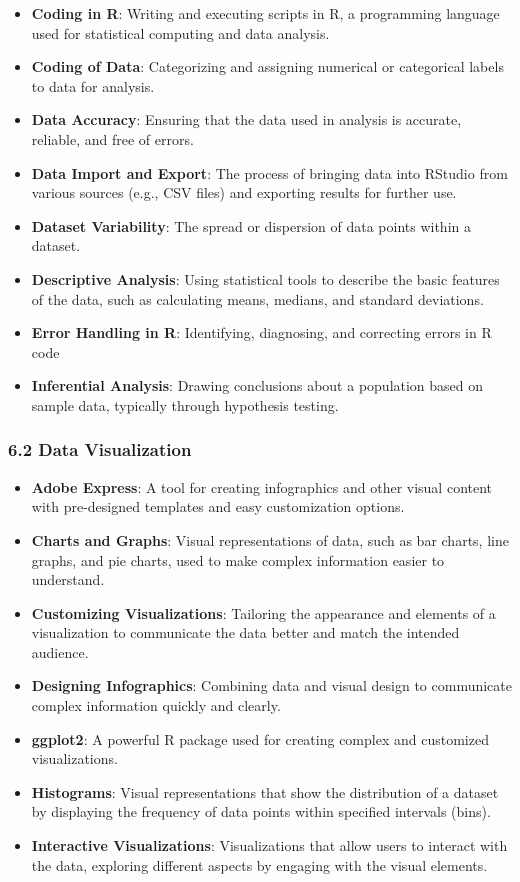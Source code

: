 \documentclass[
]{book}
\providecommand{\tightlist}{%
  \setlength{\itemsep}{0pt}\setlength{\parskip}{0pt}}
\begin{document}
\begin{itemize}
\tightlist
\item
  \textbf{Coding in R}: Writing and executing scripts in R, a programming language used for statistical computing and data analysis.
\item
  \textbf{Coding of Data}: Categorizing and assigning numerical or categorical labels to data for analysis.
\item
  \textbf{Data Accuracy}: Ensuring that the data used in analysis is accurate, reliable, and free of errors.
\item
  \textbf{Data Import and Export}: The process of bringing data into RStudio from various sources (e.g., CSV files) and exporting results for further use.
\item
  \textbf{Dataset Variability}: The spread or dispersion of data points within a dataset.
\item
  \textbf{Descriptive Analysis}: Using statistical tools to describe the basic features of the data, such as calculating means, medians, and standard deviations.
\item
  \textbf{Error Handling in R}: Identifying, diagnosing, and correcting errors in R code
\item
  \textbf{Inferential Analysis}: Drawing conclusions about a population based on sample data, typically through hypothesis testing.
\end{itemize}

\subsubsection*{\texorpdfstring{\textbf{6.2 Data Visualization}}{6.2 Data Visualization}}\label{data-visualization}

\begin{itemize}
\tightlist
\item
  \textbf{Adobe Express}: A tool for creating infographics and other visual content with pre-designed templates and easy customization options.
\item
  \textbf{Charts and Graphs}: Visual representations of data, such as bar charts, line graphs, and pie charts, used to make complex information easier to understand.
\item
  \textbf{Customizing Visualizations}: Tailoring the appearance and elements of a visualization to communicate the data better and match the intended audience.
\item
  \textbf{Designing Infographics}: Combining data and visual design to communicate complex information quickly and clearly.
\item
  \textbf{ggplot2}: A powerful R package used for creating complex and customized visualizations.
\item
  \textbf{Histograms}: Visual representations that show the distribution of a dataset by displaying the frequency of data points within specified intervals (bins).
\item
  \textbf{Interactive Visualizations}: Visualizations that allow users to interact with the data, exploring different aspects by engaging with the visual elements.
\end{itemize}
\end{document}
